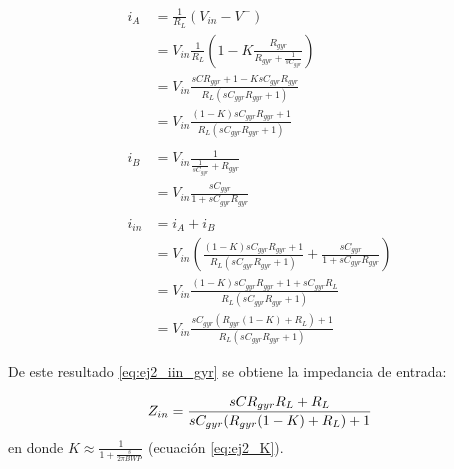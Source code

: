 \begin{align*}
i_A &= \frac{1}{R_L}\left(V_{in} - V^-\right)\\
 &= V_{in} \frac{1}{R_L}\left( 1-K\frac{R_{gyr}}{R_{gyr}+\frac{1}{sC_{gyr}}} \right)\\
 &= V_{in} \frac{sCR_{gyr}+1-KsC_{gyr}R_{gyr}}{R_L\left( sC_{gyr}R_{gyr}+1 \right)} \\
 &= V_{in} \frac{(1-K)sC_{gyr}R_{gyr}+1}{R_L\left( sC_{gyr}R_{gyr}+1 \right)}\\
 & \\
i_B &= V_{in} \frac{1}{\frac{1}{sC_{gyr}} + R_{gyr}}\\
	&= V_{in} \frac{sC_{gyr}}{1+sC_{gyr}R_{gyr}}\\
 & \\
i_{in} &= i_A + i_B \\
 &= V_{in} \left( \frac{(1-K)sC_{gyr}R_{gyr}+1}{R_L\left( sC_{gyr}R_{gyr}+1 \right)} +   \frac{sC_{gyr}}{1+sC_{gyr}R_{gyr}}   \right) \\ 
 &= V_{in}  \frac{(1-K)sC_{gyr}R_{gyr}+1 + sC_{gyr}R_L}{R_L\left( sC_{gyr}R_{gyr}+1 \right)} \\
 &= V_{in}  \frac{sC_{gyr}(R_{gyr}(1-K)+R_L) + 1}{R_L(sC_{gyr}R_{gyr}+1)}
\end{align*}

De este resultado \ref{eq:ej2_iin_gyr} se obtiene la impedancia de entrada:

\begin{equation}
	Z_{in}= \frac{ sCR_{gyr}R_L+R_L}{sC_{gyr}(R_{gyr}(1-K)+R_L) + 1} \label{eq:ej2_zin_gyr_sin_aprox} \\
\end{equation}
	en donde	$K  \approx\frac{1}{1+\frac{s}{2\pi BWP}}$ (ecuaci\'on \ref{eq:ej2_K}).
